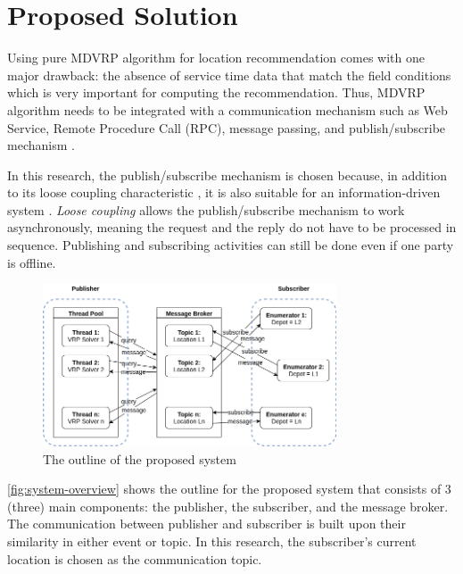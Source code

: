 \documentclass[conference]{IEEEtran}
\begin{document}
\section{Proposed Solution}
\label{sec:proposed-solution}
Using pure MDVRP algorithm for location recommendation comes with one major drawback: the absence of service time data that match the field conditions which is very important for computing the recommendation. Thus, MDVRP algorithm needs to be integrated with a communication mechanism such as Web Service, Remote Procedure Call (RPC), message passing, and publish/subscribe mechanism \cite{eugster_many_2003}.

In this research, the publish/subscribe mechanism is chosen because, in addition to its loose coupling characteristic \cite{eugster_many_2003}, it is also suitable for an information-driven system \cite{muhl_large-scale_2002}. \textit{Loose coupling} allows the publish/subscribe mechanism to work asynchronously, meaning the request and the reply do not have to be processed in sequence. Publishing and subscribing activities can still be done even if one party is offline. 


\begin{figure}[!]
	\centering
	\includegraphics[width=8.7cm]{Resources/Images/system-overview}
	\caption{The outline of the proposed system}
	\label{fig:system-overview}
\end{figure}


\autoref{fig:system-overview} shows the outline for the proposed system that consists of 3 (three) main components: the publisher, the subscriber, and the message broker. The communication between publisher and subscriber is built upon their similarity in either event or topic. In this research, the subscriber's current location is chosen as the communication topic. 


\end{document}
